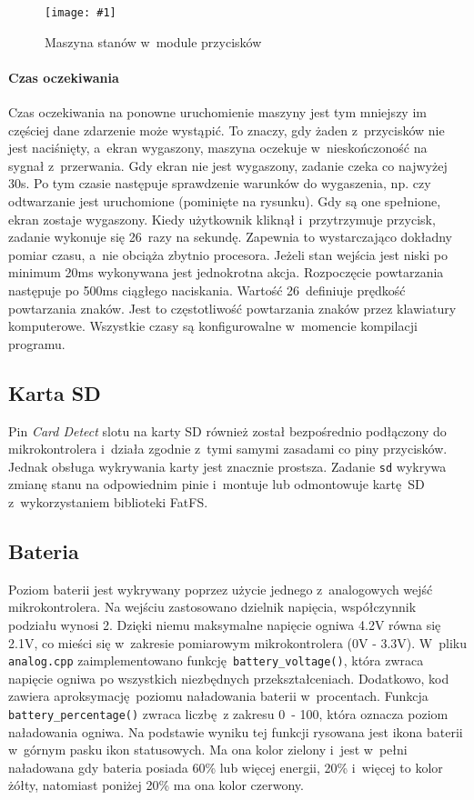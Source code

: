 \documentclass[polish]{aghengthesis}
\newcommand{\imgint}[4]{
	\begin{figure}[{#4}]
		\centering
		\texttt{[image: \#1]}
		\caption{#2}
		\label{#1}
	\end{figure}
}
\newcommand{\imgh}[3]{\imgint{#1}{#2}{#3}{H}}
\begin{document}
			\imgh{3/PicoRadio-buttons}{Maszyna stanów w~module przycisków}{0.75}
			
			\paragraph{Czas oczekiwania}
				Czas oczekiwania na ponowne uruchomienie maszyny jest tym mniejszy im częściej dane zdarzenie może wystąpić. To znaczy, gdy żaden z~przycisków nie jest naciśnięty, a~ekran wygaszony, maszyna oczekuje w~nieskończoność na sygnał z~przerwania. Gdy ekran nie jest wygaszony, zadanie czeka co najwyżej 30s. Po tym czasie następuje sprawdzenie warunków do wygaszenia, np. czy odtwarzanie jest uruchomione (pominięte na rysunku). Gdy są one spełnione, ekran zostaje wygaszony. Kiedy użytkownik kliknął i~przytrzymuje przycisk, zadanie wykonuje się 26~razy na sekundę. Zapewnia to wystarczająco dokładny pomiar czasu, a~nie obciąża zbytnio procesora. Jeżeli stan wejścia jest niski po minimum 20ms wykonywana jest jednokrotna akcja. Rozpoczęcie powtarzania następuje po 500ms ciągłego naciskania. Wartość 26~definiuje prędkość powtarzania znaków. Jest to częstotliwość powtarzania znaków przez klawiatury komputerowe. Wszystkie czasy są konfigurowalne w~momencie kompilacji programu.
		
		\subsection{Karta SD}
			Pin \textit{Card Detect} slotu na karty SD również został bezpośrednio podłączony do mikrokontrolera i~działa zgodnie z~tymi samymi zasadami co piny przycisków. Jednak obsługa wykrywania karty jest znacznie prostsza. Zadanie \lstinline|sd| wykrywa zmianę stanu na odpowiednim pinie i~montuje lub odmontowuje kartę SD z~wykorzystaniem biblioteki FatFS.
			
		\subsection{Bateria}
			Poziom baterii jest wykrywany poprzez użycie jednego z~analogowych wejść mikrokontrolera. Na wejściu zastosowano dzielnik napięcia, współczynnik podziału wynosi 2. Dzięki niemu maksymalne napięcie ogniwa 4.2V równa się 2.1V, co mieści się w~zakresie pomiarowym mikrokontrolera (0V - 3.3V). W~pliku \lstinline|analog.cpp| zaimplementowano funkcję \lstinline|battery_voltage()|, która zwraca napięcie ogniwa po wszystkich niezbędnych przekształceniach. Dodatkowo, kod zawiera aproksymację poziomu naładowania baterii w~procentach. Funkcja \lstinline|battery_percentage()| zwraca liczbę z zakresu 0~- 100, która oznacza poziom naładowania ogniwa. Na podstawie wyniku tej funkcji rysowana jest ikona baterii w~górnym pasku ikon statusowych. Ma ona kolor zielony i~jest w~pełni naładowana gdy bateria posiada 60\% lub więcej energii, 20\% i~więcej to kolor żółty, natomiast poniżej 20\% ma ona kolor czerwony.
		
\end{document}
